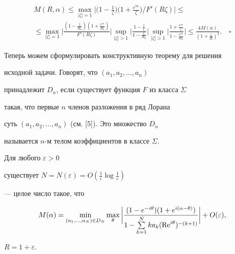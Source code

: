 \begin{multline*}


M(R,\alpha) \leq


\max_{|\zeta|=1}\bigg|\bigg(1-\frac{1}{\zeta}\bigg)\bigg(1+


\frac{e^{i\alpha}}{\zeta}\bigg)/F'(R\zeta)\bigg| \leq \\


%


\le \max_{|\zeta|=1}\bigg|\frac{(1-\frac{1}{R\zeta})


(1+\frac{e^{i\alpha}}{R\zeta})}{F'(R\zeta)}\bigg|


\sup_{|\zeta|>1}\bigg|\frac{1-\frac{1}{\zeta}}{1-\frac{1}{R\zeta}}\bigg|


\sup_{|\zeta|>1}\bigg|


\frac{1+\frac{e^{i\alpha}}{\zeta}}{1-\frac{e^{i\alpha}}{R\zeta}}\bigg|


\leq


\frac{4M(\alpha)}{(1+\frac{1}{R})^2}.\quad\square


\end{multline*}





Теперь можем сформулировать конструктивную теорему для решения


исходной задачи. Говорят, что $(a_1, a_2,\dotsc, a_n)$


принадлежит $D_n$, если существует функция $F$ из класса $\Sigma$


такая, что первые $n$ членов разложения в ряд Лорана


суть $(a_1, a_2,\dotsc, a_n)$ (см. [5]). Это множество $D_n$


называется $n$-м телом коэффициентов в классе $\Sigma$.





\begin{thm} Для любого $\varepsilon > 0$


существует $N=N(\varepsilon)=


O(\frac{1}{\varepsilon}\log\frac{1}{\varepsilon})$


--- целое число такое, что


$$


M(\alpha)= \min_{(a_1,\dotsc,a_N) \in D_N}\max_{\theta}


\bigg|\frac{(1-e^{-i\theta})(1+e^{i(\alpha -\theta)})}


{1-\sum\limits_{k=1}^{N}ka_k(\re^{i\theta})^{-(k+1)}}\bigg|+O(\varepsilon),


$$


$R=1+\varepsilon$.


\end{thm}





